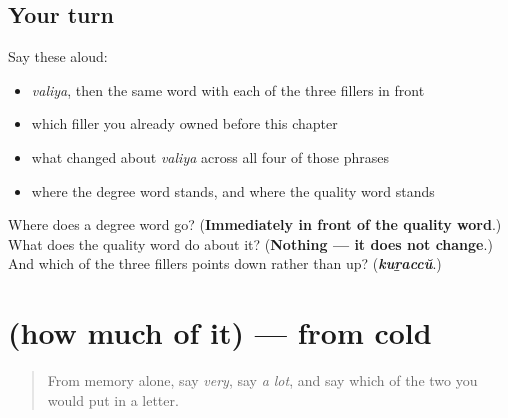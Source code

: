 \subsection*{Your turn}
Say these aloud:

\begin{itemize}
\raggedright
  \item \emph{valiya}, then the same word with each of the three fillers in front
  \item which filler you already owned before this chapter
  \item what changed about \emph{valiya} across all four of those phrases
  \item where the degree word stands, and where the quality word stands
\end{itemize}

\begin{tcolorbox}[breakable,colback=teal!4,colframe=teal!35!black,title={Before you move on}]
Where does a degree word go? (\textbf{Immediately in front of the quality word}.) What does the quality word do about it? (\textbf{Nothing — it does not change}.) And which of the three fillers points down rather than up? (\emph{\textbf{kuṟaccŭ}}.)
\end{tcolorbox}
\section[(how much of it)]{(how much of it) — from cold}

\label{lesson:ML-R79-degree-recall}



\begin{quote}
From memory alone, say \emph{very}, say \emph{a lot}, and say which of the two you would put in a letter.
\end{quote}

